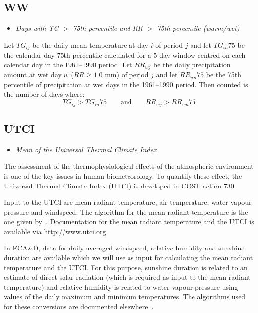 \documentclass[a4paper,11pt]{article}
\begin{document}
\subsection*{WW}
\begin{itemize}
\item \textit{Days with TG $>$ 75th percentile and RR $>$ 75th percentile (warm/wet)}
\end{itemize}
Let $TG_{ij}$ be the daily mean temperature at day $i$ of period $j$
and let $TG_{in}75$ be the calendar day 75th percentile calculated for
a 5-day window centred on each calendar day in the 1961--1990
period. Let $RR_{wj}$ be the daily precipitation amount at wet day $w$
($RR\geq1.0$ mm) of period $j$ and let $RR_{wn}75$ be the 75th
percentile of precipitation at wet days in the 1961--1990 period. Then
counted is the number of days where:
\begin{equation*}
TG_{ij} > TG_{in}75 \qquad \textrm{and} \qquad RR_{wj} > RR_{wn}75
\end{equation*}

\subsection*{UTCI}
\begin{itemize}
\item \textit{Mean of the Universal Thermal Climate Index}
\end{itemize}

The assessment of the thermophysiological effects of the atmospheric environment is one of the key issues in
human biometeorology. To quantify these effect, the Universal Thermal Climate Index (UTCI) is developed
in COST action 730. 

Input to the UTCI are mean radiant temperature, air temperature, water vapour 
pressure and windspeed.
The algorithm for the mean radiant temperature is the one given by~\citet{fanger:70}. Documentation for
the mean radiant temperature and the UTCI is available via http://www.utci.org.

In ECA\&D, data for daily averaged windspeed, relative humidity and sunshine duration are available which
we will use as input for calculating the mean radiant temperature and the UTCI. For this purpose, sunshine 
duration is related to an estimate of direct solar radiation (which is required as input to the mean radiant
temperature) and relative humidity is related to 
water vapour pressure using values of the daily maximum and minimum temperatures. The algorithms used for
these conversions are documented elsewhere~\citet{allen:94a,allen:94b,duffie:91}.
\end{document}
